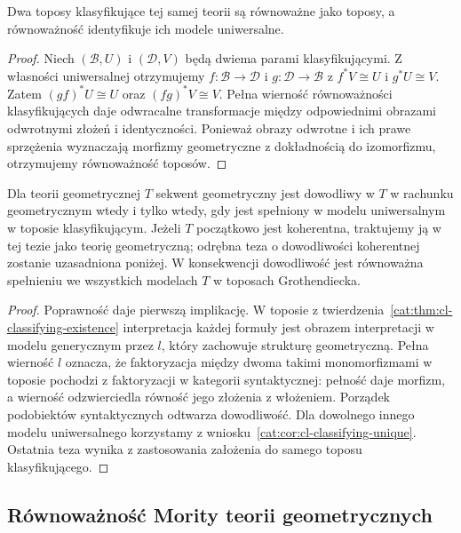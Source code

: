 \begin{wniosek}\label{cat:cor:cl-classifying-unique}
Dwa toposy klasyfikujące tej samej teorii są równoważne jako toposy, a równoważność identyfikuje ich modele uniwersalne.
\end{wniosek}
\begin{proof}
Niech $(\mathcal B,U)$ i $(\mathcal D,V)$ będą dwiema parami klasyfikującymi. Z własności uniwersalnej otrzymujemy $f:\mathcal B\to\mathcal D$ i $g:\mathcal D\to\mathcal B$ z $f^*V\cong U$ i $g^*U\cong V$. Zatem $(gf)^*U\cong U$ oraz $(fg)^*V\cong V$. Pełna wierność równoważności klasyfikujących daje odwracalne transformacje między odpowiednimi obrazami odwrotnymi złożeń i identyczności. Ponieważ obrazy odwrotne i ich prawe sprzężenia wyznaczają morfizmy geometryczne z dokładnością do izomorfizmu, otrzymujemy równoważność toposów.
\end{proof}

\begin{wniosek}\label{cat:cor:cl-universal-completeness}
Dla teorii geometrycznej $T$ sekwent geometryczny jest dowodliwy w $T$ w rachunku geometrycznym wtedy i tylko wtedy, gdy jest spełniony w modelu uniwersalnym w toposie klasyfikującym. Jeżeli $T$ początkowo jest koherentna, traktujemy ją w tej tezie jako teorię geometryczną; odrębna teza o dowodliwości koherentnej zostanie uzasadniona poniżej. W konsekwencji dowodliwość jest równoważna spełnieniu we wszystkich modelach $T$ w toposach Grothendiecka.
\end{wniosek}
\begin{proof}
Poprawność daje pierwszą implikację. W toposie z twierdzenia~\ref{cat:thm:cl-classifying-existence} interpretacja każdej formuły jest obrazem interpretacji w modelu generycznym przez $l$, który zachowuje strukturę geometryczną. Pełna wierność $l$ oznacza, że faktoryzacja między dwoma takimi monomorfizmami w toposie pochodzi z faktoryzacji w kategorii syntaktycznej: pełność daje morfizm, a wierność odzwierciedla równość jego złożenia z włożeniem. Porządek podobiektów syntaktycznych odtwarza dowodliwość. Dla dowolnego innego modelu uniwersalnego korzystamy z wniosku~\ref{cat:cor:cl-classifying-unique}. Ostatnia teza wynika z zastosowania założenia do samego toposu klasyfikującego.
\end{proof}

\subsection{Równoważność Mority teorii geometrycznych}


